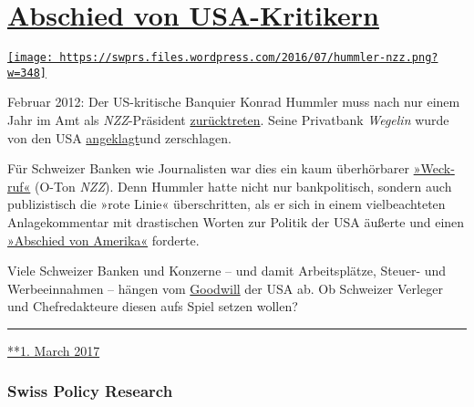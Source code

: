 \hypertarget{abschied-von-usa-kritikern}{%
\section{\texorpdfstring{\href{https://swprs.org/2017/03/01/abschied-von-usa-kritikern/}{Abschied
von
USA-Kritikern}}{Abschied von USA-Kritikern}}\label{abschied-von-usa-kritikern}}

\href{https://swprs.org/2017/03/01/abschied-von-usa-kritikern/}{\texttt{[image: https://swprs.files.wordpress.com/2016/07/hummler-nzz.png?w=348]}}

Februar 2012: Der US-kritische Banquier Konrad Hummler muss nach nur
einem Jahr im Amt als \emph{NZZ}-Präsi­dent
\href{https://www.tagesanzeiger.ch/wirtschaft/unternehmen-und-konjunktur/Konrad-Hummler-gibt-NZZVRPraesidium-ab/story/25627682}{zurück­treten}.
Seine Privatbank \emph{Wegelin} wurde von den USA
\href{https://www.tagesanzeiger.ch/wirtschaft/unternehmen-und-konjunktur/USA-erhoehen-mit-WegelinKlage-den-Druck/story/25658973}{an­ge­klagt}und
zerschlagen.

Für Schweizer Banken wie Journalisten war dies ein kaum über­hör­ba­rer
\href{http://www.nzz.ch/ein-weckruf-fuer-die-schweiz-1.14608280}{»Weck­ruf«}
(O-Ton \emph{NZZ}). Denn Hummler hatte nicht nur bank­politisch, sondern
auch publi­zistisch die »rote Linie« über­schritten, als er sich in
einem viel­beachteten An­la­ge­kom­men­tar mit dras­ti­schen Worten zur
Po­li­tik der USA äußerte und einen
\href{https://swprs.files.wordpress.com/2016/03/usa_wegelin_kommentar_2009.pdf}{»Abschied
von Amerika«} forderte.

Viele Schwei­zer Banken und Konzerne -- und da­mit Ar­beits­plätze,
Steuer- und Werbe­ein­nah­men -- hän­gen vom
\href{http://www.finews.ch/news/finanzplatz/21359-us-steuerstreit-kategorie-2-kategorie-1-lombard-odier-julius-b\%C3\%A4r-department-of-justice}{Good­will}
der USA ab. Ob Schweizer Ver­le­ger und Chef­re­dak­teure diesen aufs
Spiel setzen wollen?

\begin{center}\rule{0.5\linewidth}{\linethickness}\end{center}

\href{https://swprs.org/2017/03/01/abschied-von-usa-kritikern/}{**1.
March 2017}

\hypertarget{swiss-policy-research}{%
\subsubsection{Swiss Policy Research}\label{swiss-policy-research}}


